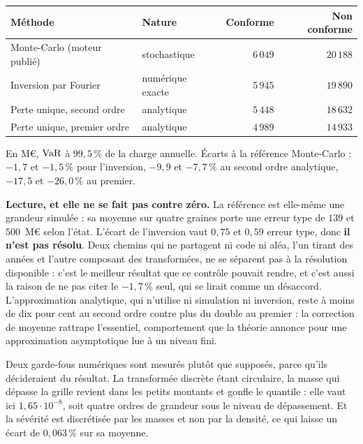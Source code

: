 \begin{center}\footnotesize
\renewcommand{\arraystretch}{1.25}
\begin{tabular}{@{}l l r r@{}}
\toprule
\textbf{Méthode} & \textbf{Nature} & \textbf{Conforme} & \textbf{Non conforme} \\
\midrule
Monte-Carlo (moteur publié) & stochastique & $6\,049$ & $20\,188$ \\
Inversion par Fourier & numérique exacte & $5\,945$ & $19\,890$ \\
Perte unique, second ordre & analytique & $5\,448$ & $18\,632$ \\
Perte unique, premier ordre & analytique & $4\,989$ & $14\,933$ \\
\bottomrule
\end{tabular}
\end{center}

\vspace{4pt}
\noindent En M\euro, $\mathrm{VaR}$ à $99{,}5\,\%$ de la charge annuelle. Écarts à la référence
Monte-Carlo : $-1{,}7$ et $-1{,}5\,\%$ pour l'inversion, $-9{,}9$ et $-7{,}7\,\%$ au second ordre
analytique, $-17{,}5$ et $-26{,}0\,\%$ au premier.

\textbf{Lecture, et elle ne se fait pas contre zéro.} La référence est elle-même une grandeur
simulée : sa moyenne sur quatre graines porte une erreur type de $139$ et $500$~M\euro{} selon
l'état. L'écart de l'inversion vaut $0{,}75$ et $0{,}59$ erreur type, donc \textbf{il n'est pas
résolu}. Deux chemins qui ne partagent ni code ni aléa, l'un tirant des années et l'autre
composant des transformées, ne se séparent pas à la résolution disponible : c'est le meilleur
résultat que ce contrôle pouvait rendre, et c'est aussi la raison de ne pas citer le $-1{,}7\,\%$
seul, qui se lirait comme un désaccord. L'approximation analytique, qui n'utilise ni simulation
ni inversion, reste à moins de dix pour cent au second ordre contre plus du double au premier :
la correction de moyenne rattrape l'essentiel, comportement que la théorie annonce pour une
approximation asymptotique lue à un niveau fini.

Deux garde-fous numériques sont mesurés plutôt que supposés, parce qu'ils décideraient du
résultat. La transformée discrète étant circulaire, la masse qui dépasse la grille revient dans
les petits montants et gonfle le quantile : elle vaut ici $1{,}65\cdot 10^{-8}$, soit quatre ordres
de grandeur sous le niveau de dépassement. Et la sévérité est discrétisée par les masses et non
par la densité, ce qui laisse un écart de $0{,}063\,\%$ sur sa moyenne.

